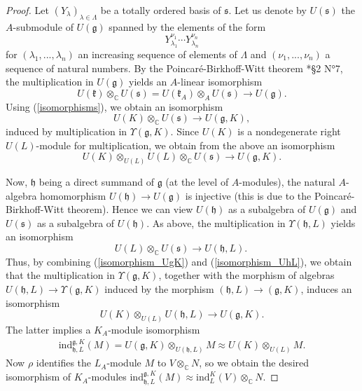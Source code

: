 \documentclass{amsart}
\theoremstyle{definition}
\begin{document}
\begin{proof}
    Let $(Y_\lambda)_{\lambda \in \Lambda}$ be a totally ordered basis of $\mathfrak{s}$. Let us denote by $U(\mathfrak{s})$ the $A$-submodule of $U(\mathfrak{g})$ spanned by the elements of the form
    \[Y^{\nu_1}_{\lambda_1}\dotsb Y^{\nu_n}_{\lambda_n}\]
    for $(\lambda_1, ...,\lambda_n)$ an increasing sequence of elements of $\Lambda$ and $(\nu_1, ..., \nu_n)$ a sequence of natural numbers. By the Poincaré-Birkhoff-Witt theorem \cite{GrAlLie1}*{§2 N°7}, the multiplication in $U(\mathfrak{g})$ yields an $A$-linear isomorphism
    \[U(\mathfrak{k}) \otimes_\mathbb{C}U(\mathfrak{s}) = U(\mathfrak{k}_A) \otimes_AU(\mathfrak{s}) \to U(\mathfrak{g}).\]
    Using (\ref{isomorphisms}), we obtain an isomorphism
    \[U(K) \otimes_\mathbb{C}U(\mathfrak{s}) \to U(\mathfrak{g},K),\]
    induced by multiplication in $\Upsilon(\mathfrak{g},K)$. Since $U(K)$ is a nondegenerate right $U(L)$-module for multiplication, we obtain from the above an isomorphism
    \begin{equation}\label{isomorphism_UgK}
        U(K)\otimes_{U(L)} U(L)\otimes_\mathbb{C} U(\mathfrak{s}) \to U(\mathfrak{g},K).
    \end{equation}

    Now, $\mathfrak{h}$ being a direct summand of $\mathfrak{g}$ (at the level of $A$-modules), the natural $A$-algebra homomorphism $U(\mathfrak{h}) \to U(\mathfrak{g})$ is injective (this is due to the Poincaré-Birkhoff-Witt theorem). Hence we can view $U(\mathfrak{h})$ as a subalgebra of $U(\mathfrak{g})$ and $U(\mathfrak{s})$ as a subalgebra of $U(\mathfrak{h})$. As above, the multiplication in $\Upsilon(\mathfrak{h},L)$ yields an isomorphism
    \begin{equation}\label{isomorphism_UhL}
        U(L) \otimes_\mathbb{C} U(\mathfrak{s}) \to U(\mathfrak{h},L).\
    \end{equation}
    Thus, by combining (\ref{isomorphism_UgK}) and (\ref{isomorphism_UhL}), we obtain that the multiplication in $\Upsilon(\mathfrak{g},K)$, together with the morphism of algebras $U(\mathfrak{h},L) \to \Upsilon(\mathfrak{g},K)$ induced by the morphism $(\mathfrak{h},L) \to (\mathfrak{g},K)$, induces an isomorphism
    \[U(K) \otimes_{U(L)} U(\mathfrak{h},L) \to U(\mathfrak{g},K).\]
    The latter implies a $K_A$-module isomorphism
    \begin{align*}
        \mathrm{ind}_{\mathfrak{h},L}^{\mathfrak{g},K}(M) = U(\mathfrak{g},K) \otimes_{U(\mathfrak{h},L)}M \approx U(K) \otimes_{U(L)}M.
    \end{align*}
    Now $\rho$ identifies the $L_A$-module $M$ to $V \otimes_\mathbb{C}N$, so we obtain the desired isomorphism of $K_A$-modules $\mathrm{ind}_{\mathfrak{h},L}^{\mathfrak{g},K}(M) \approx \mathrm{ind}_L^K(V) \otimes_\mathbb{C} N$.
\end{proof}
\end{document}
